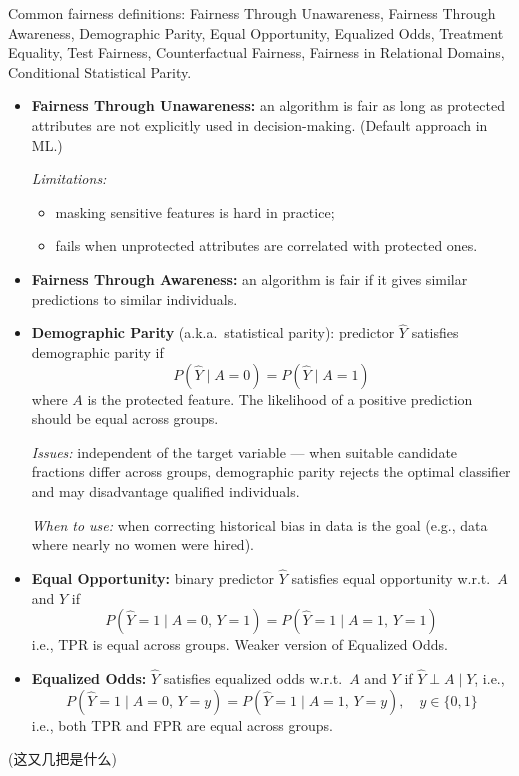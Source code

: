 \documentclass[UTF8]{ctexart}
\begin{document}
Common fairness definitions: Fairness Through Unawareness, Fairness Through Awareness, Demographic Parity, Equal Opportunity, Equalized Odds, Treatment Equality, Test Fairness, Counterfactual Fairness, Fairness in Relational Domains, Conditional Statistical Parity.

\begin{itemize}
    \item \textbf{Fairness Through Unawareness:} an algorithm is fair as long as protected attributes are not explicitly used in decision-making. (Default approach in ML.)

    \textit{Limitations:}
    \begin{itemize}
        \item masking sensitive features is hard in practice;
        \item fails when unprotected attributes are correlated with protected ones.
    \end{itemize}
    \item \textbf{Fairness Through Awareness:} an algorithm is fair if it gives similar predictions to similar individuals.

    \item \textbf{Demographic Parity} (a.k.a.\ statistical parity): predictor $\hat{Y}$ satisfies demographic parity if
    \[
        P(\hat{Y} \mid A=0) = P(\hat{Y} \mid A=1)
    \]
    where $A$ is the protected feature. The likelihood of a positive prediction should be equal across groups.

    \textit{Issues:} independent of the target variable — when suitable candidate fractions differ across groups, demographic parity rejects the optimal classifier and may disadvantage qualified individuals.

    \textit{When to use:} when correcting historical bias in data is the goal (e.g., data where nearly no women were hired).

    \item \textbf{Equal Opportunity:} binary predictor $\hat{Y}$ satisfies equal opportunity w.r.t.\ $A$ and $Y$ if
    \[
        P(\hat{Y}=1 \mid A=0,\, Y=1) = P(\hat{Y}=1 \mid A=1,\, Y=1)
    \]
    i.e., TPR is equal across groups. Weaker version of Equalized Odds.

    \item \textbf{Equalized Odds:} $\hat{Y}$ satisfies equalized odds w.r.t.\ $A$ and $Y$ if $\hat{Y} \perp A \mid Y$, i.e.,
    \[
        P(\hat{Y}=1 \mid A=0,\, Y=y) = P(\hat{Y}=1 \mid A=1,\, Y=y), \quad y \in \{0,1\}
    \]
    i.e., both TPR and FPR are equal across groups.
\end{itemize}
(这又几把是什么)
\end{document}
